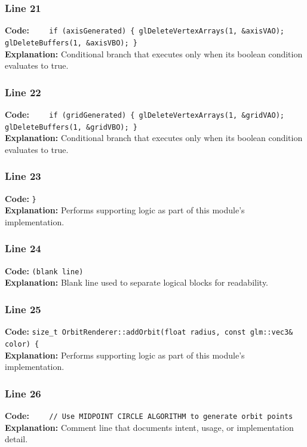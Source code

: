 \documentclass[11pt,a4paper]{article}
\begin{document}
\subsubsection*{Line 21}
\textbf{Code:} \verb|    if (axisGenerated) { glDeleteVertexArrays(1, &axisVAO); glDeleteBuffers(1, &axisVBO); }|\\
\textbf{Explanation:} Conditional branch that executes only when its boolean condition evaluates to true.

\subsubsection*{Line 22}
\textbf{Code:} \verb|    if (gridGenerated) { glDeleteVertexArrays(1, &gridVAO); glDeleteBuffers(1, &gridVBO); }|\\
\textbf{Explanation:} Conditional branch that executes only when its boolean condition evaluates to true.

\subsubsection*{Line 23}
\textbf{Code:} \verb|}|\\
\textbf{Explanation:} Performs supporting logic as part of this module's implementation.

\subsubsection*{Line 24}
\textbf{Code:} \texttt{(blank line)}\\
\textbf{Explanation:} Blank line used to separate logical blocks for readability.

\subsubsection*{Line 25}
\textbf{Code:} \verb|size_t OrbitRenderer::addOrbit(float radius, const glm::vec3& color) {|\\
\textbf{Explanation:} Performs supporting logic as part of this module's implementation.

\subsubsection*{Line 26}
\textbf{Code:} \verb|    // Use MIDPOINT CIRCLE ALGORITHM to generate orbit points|\\
\textbf{Explanation:} Comment line that documents intent, usage, or implementation detail.
\end{document}
